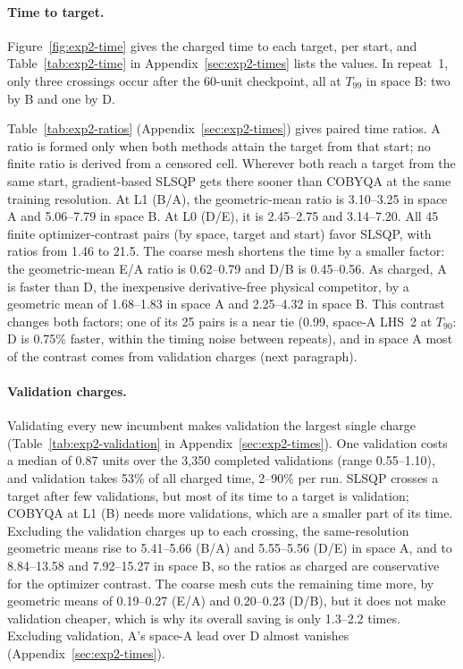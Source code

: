 \paragraph{Time to target.}
Figure~\ref{fig:exp2-time} gives the charged time to each target, per
start, and Table~\ref{tab:exp2-time} in Appendix~\ref{sec:exp2-times} lists
the values. In repeat~1, only three crossings occur
after the 60-unit checkpoint, all at $T_{99}$ in space B: two by B and one
by D.

Table~\ref{tab:exp2-ratios} (Appendix~\ref{sec:exp2-times}) gives paired time ratios. A ratio is formed
only when both methods attain the target from that start; no finite ratio
is derived from a censored cell. Wherever both reach a target from the
same start, gradient-based SLSQP gets there sooner than COBYQA at the same
training resolution. At L1 (B/A), the geometric-mean ratio is 3.10--3.25 in
space A and 5.06--7.79 in space B. At L0 (D/E), it is 2.45--2.75 and
3.14--7.20.
All 45 finite optimizer-contrast pairs (by space, target and start) favor
SLSQP, with ratios from 1.46 to 21.5. The coarse mesh shortens the time by
a smaller factor: the geometric-mean E/A ratio is 0.62--0.79 and D/B is
0.45--0.56. As charged, A is faster than D, the inexpensive derivative-free
physical competitor, by a geometric mean of 1.68--1.83 in space A and
2.25--4.32 in space B. This contrast changes both factors; one of its 25
pairs is a near tie (0.99, space-A LHS~2 at $T_{90}$: D is 0.75\% faster,
within the timing noise between repeats), and in space A most of the
contrast comes from validation charges (next paragraph).

\paragraph{Validation charges.}
Validating every new incumbent makes validation the largest single
charge (Table~\ref{tab:exp2-validation} in Appendix~\ref{sec:exp2-times}). One validation costs a median of
0.87 units over the 3,350 completed validations (range 0.55--1.10), and
validation takes 53\% of all charged time, 2--90\% per run. SLSQP crosses
a target after few validations, but most of its time to a target is
validation; COBYQA at L1 (B) needs more validations, which are a smaller
part of its time. Excluding the validation charges up to each crossing, the
same-resolution geometric means rise to 5.41--5.66 (B/A) and 5.55--5.56
(D/E) in space A, and to 8.84--13.58 and 7.92--15.27 in space B, so the
ratios as charged are conservative for the optimizer contrast. The coarse
mesh cuts the remaining time more, by geometric means of 0.19--0.27 (E/A)
and 0.20--0.23 (D/B), but it does not make validation cheaper, which is why
its overall saving is only 1.3--2.2 times. Excluding validation, A's space-A lead over D almost
vanishes (Appendix~\ref{sec:exp2-times}).

